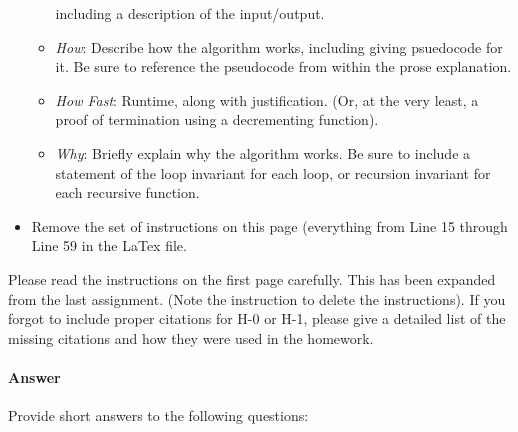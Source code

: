 \documentclass{article}
\begin{document}
\begin{itemize}
\begin{itemize}
                including a description of the input/output.
            \item \emph{How}: Describe how the algorithm works, including giving
                psuedocode for it.  Be sure to reference the pseudocode
                from within the prose explanation.
            \item \emph{How Fast}: Runtime, along with justification.  (Or, at
                the very least, a proof of termination using a decrementing function).
            \item \emph{Why}: Briefly explain why the algorithm works.  Be sure
                to include a statement of the loop invariant for each loop, or
                recursion invariant for each recursive function.
        \end{itemize}
    \item Remove the set of instructions on this page (everything from Line 15
        through Line 59 in the LaTex file.
\end{itemize}

\collab{\todo{}}

Please read the instructions on the first page carefully.  This has been
expanded from the last assignment.  (Note the instruction to delete the
instructions).  If you forgot to include proper citations for H-0 or H-1, please
give a detailed list of the missing citations and how they were used in the
homework.

\paragraph{Answer} \todo{}


\collab{\todo{}}

Provide short answers to the following questions:
\end{document}
